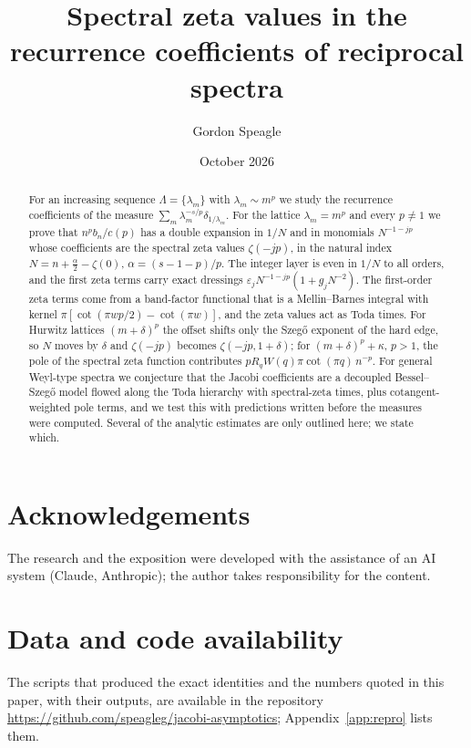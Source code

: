 \documentclass[11pt]{amsart}
\title[Spectral zeta values in recurrence coefficients]{Spectral zeta values in the recurrence coefficients of reciprocal
spectra}
\author{Gordon Speagle}
\date{October 2026}
\theoremstyle{definition}
\theoremstyle{remark}
\numberwithin{equation}{section}
\numberwithin{table}{section}
\begin{document}
\begin{abstract}
For an increasing sequence $\Lambda=\{\lambda_m\}$ with $\lambda_m\sim m^p$ we study the recurrence coefficients of the
measure $\sum_m\lambda_m^{-s/p}\delta_{1/\lambda_m}$. For the lattice $\lambda_m=m^p$ and every $p\ne1$ we prove that
$n^pb_n/c(p)$ has a double expansion in $1/N$ and in monomials $N^{-1-jp}$ whose coefficients are the spectral zeta values
$\zeta(-jp)$, in the natural index $N=n+\frac\alpha2-\zeta(0)$, $\alpha=(s-1-p)/p$. The integer layer is even in $1/N$ to all
orders, and the first zeta terms carry exact dressings $\varepsilon_jN^{-1-jp}(1+g_jN^{-2})$. The first-order zeta terms come from a
band-factor functional that is a Mellin--Barnes integral with kernel $\pi[\cot(\pi wp/2)-\cot(\pi w)]$, and the zeta values act as Toda times. For Hurwitz
lattices $(m+\delta)^p$ the offset shifts only the Szeg\H{o} exponent of the hard edge, so $N$ moves by $\delta$ and $\zeta(-jp)$
becomes $\zeta(-jp,1+\delta)$; for $(m+\delta)^p+\kappa$, $p>1$, the pole of the spectral zeta function contributes
$pR_qW(q)\pi\cot(\pi q)\,n^{-p}$. For general Weyl-type spectra we conjecture that the Jacobi coefficients are a decoupled
Bessel--Szeg\H{o} model flowed along the Toda hierarchy with spectral-zeta times, plus cotangent-weighted pole terms, and we test
this with predictions written before the measures were computed. Several of the analytic estimates are only outlined here; we state
which.
\end{abstract}

\maketitle









\appendix



\section*{Acknowledgements}
The research and the exposition were developed with the assistance of an AI system (Claude, Anthropic); the author
takes responsibility for the content.

\section*{Data and code availability}
{\raggedright The scripts that produced the exact identities and the numbers quoted in this paper, with their outputs, are
available in the repository \url{https://github.com/speagleg/jacobi-asymptotics}; Appendix~\ref{app:repro} lists them.
\par}



\end{document}

